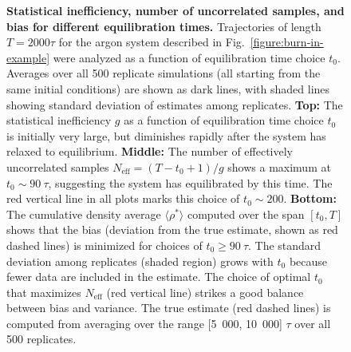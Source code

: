 \documentclass[aps,pre,twocolumn,nofootinbib,superscriptaddress,linenumbers,11point]{revtex4-1}
\newcommand{\expect}[1]{\langle #1 \rangle}                %
\begin{document}
\begin{figure}[tbp]
\caption{\label{figure:reverse-cumulative-average} {\bf Statistical inefficiency, number of uncorrelated samples, and bias for different equilibration times.} 
Trajectories of length $T = 2000 \tau$ for the argon system described in Fig.~\ref{figure:burn-in-example} were analyzed as a function of equilibration time choice $t_0$.
Averages over all 500 replicate simulations (all starting from the same initial conditions) are shown as dark lines, with shaded lines showing standard deviation of estimates among replicates.
{\bf Top:} The statistical inefficiency $g$ as a function of equilibration time choice $t_0$ is initially very large, but diminishes rapidly after the system has relaxed to equilibrium.
{\bf Middle:} The number of effectively uncorrelated samples $N_\mathrm{eff} = (T - t_0 + 1) / g$ shows a maximum at $t_0 \sim 90~\tau$, suggesting the system has equilibrated by this time.
The red vertical line in all plots marks this choice of $t_0 \sim 200$.
{\bf Bottom:} The cumulative density average $\expect{\rho^*}$ computed over the span $[t_0, T]$ shows that the bias (deviation from the true estimate, shown as red dashed lines) is minimized for choices of $t_0 \ge 90~\tau$.
The standard deviation among replicates (shaded region) grows with $t_0$ because fewer data are included in the estimate.
The choice of optimal $t_0$ that maximizes $N_\mathrm{eff}$ (red vertical line) strikes a good balance between bias and variance.
The true estimate (red dashed lines) is computed from averaging over the range [5~000, 10~000] $\tau$ over all 500 replicates.
}
\end{figure}

\end{document}
